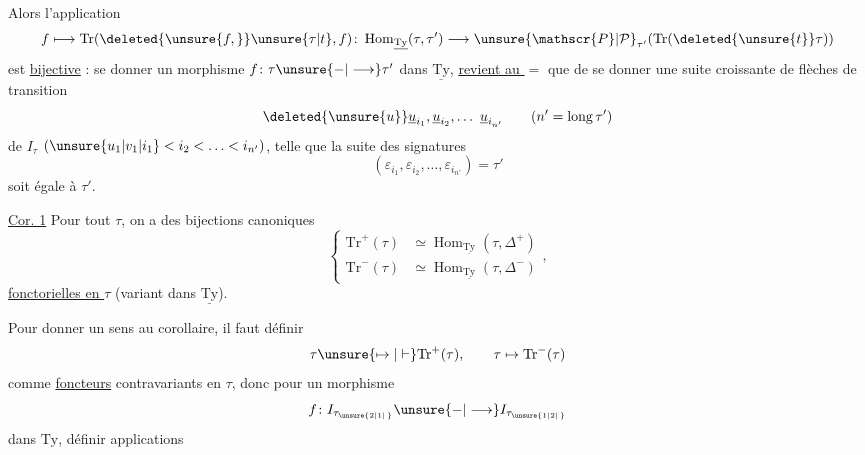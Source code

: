 Alors l'application 
\[
 f\longmapsto\mathrm{Tr}(\deleted{\unsure{f,}}\unsure{\tau|t},f)\colon
 \operatorname{Hom}_{\underline{\mathrm{Ty}}}(\tau,\tau')\longrightarrow
 \unsure{\mathscr{P}|\mathcal{P}}_{\tau'}(\mathrm{Tr}(\deleted{\unsure{t}}\tau))
\]
est \uline{bijective} : se donner un morphisme
$f\colon\tau\unsure{\mathbin{-}|\longrightarrow}\tau'$ dans $\underline{\mathrm{Ty}}$, \uline{revient au $=$} que
de se donner une suite  croissante de
flèches de transition
\[
 \deleted{\unsure{u}}\underline{u}_{i_1},\underline{u}_{i_2},\ldots\ \underline{u}_{i_{n'}}
 \qquad(n'=\operatorname{long}\tau')
\]
de $I_\tau$ $(\unsure{u_1|v_1|i_1}<i_2<\ldots<i_{n'})$, telle que
la suite des signatures 
\[
 (\varepsilon_{i_1},\varepsilon_{i_2},\ldots,\varepsilon_{i_{n'}})=\tau'
\]
soit égale à $\tau'$.

\uline{Cor. 1} Pour tout $\tau$, on a des bijections
canoniques
\[
\left\{\begin{aligned}
\mathrm{Tr}^+(\tau)&\simeq\operatorname{Hom}_{\underline{\mathrm{Ty}}}(\tau,\Delta^+)\\
\mathrm{Tr}^-(\tau)&\simeq\operatorname{Hom}_{\underline{\mathrm{Ty}}}(\tau,\Delta^-)
\end{aligned}\right.,
\]
\uline{fonctorielles en $\tau$} (variant dans $\underline{\mathrm{Ty}}$).

Pour donner un sens au corollaire, il
faut définir 
\[
 \tau\unsure{\mapsto|\mathrel{\vdash}}\mathrm{Tr}^{+}(\tau),\qquad \tau\mapsto\mathrm{Tr}^{-}(\tau)
\]
comme \uline{foncteurs} contravariants en $\tau$, donc
pour un morphisme
\[
 f\colon I_{\tau_{\unsure{2|1|\,}}}\unsure{\mathbin{-}|\longrightarrow}I_{\tau_{\unsure{1|2|\,}}}
\]
dans $\mathrm{Ty}$, définir  applications
